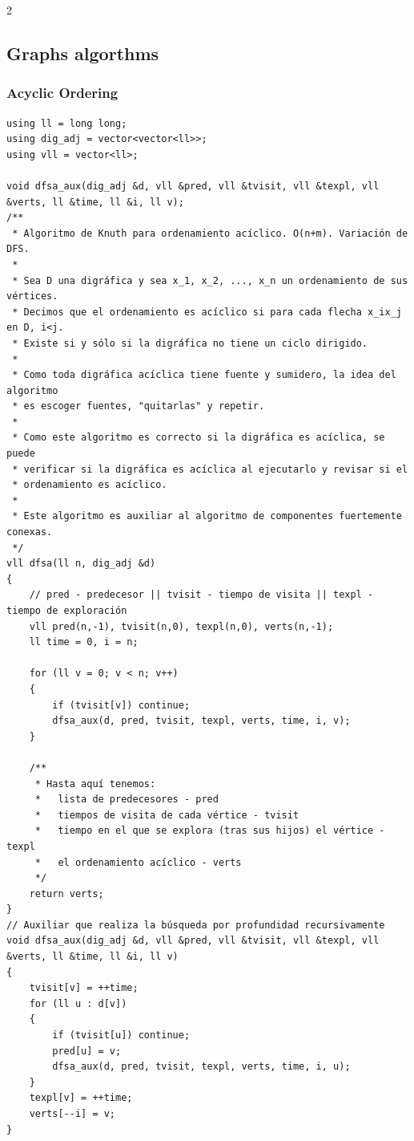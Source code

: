 \documentclass[twoside]{article}
\begin{document}
\begin{multicols*}{2}
	{
		\subsection*{Graphs algorthms}
	}
	{
		\subsubsection*{Acyclic Ordering}
	}
	\begin{verbatim}
using ll = long long;
using dig_adj = vector<vector<ll>>;
using vll = vector<ll>;

void dfsa_aux(dig_adj &d, vll &pred, vll &tvisit, vll &texpl, vll &verts, ll &time, ll &i, ll v);
/**
 * Algoritmo de Knuth para ordenamiento acíclico. O(n+m). Variación de DFS.
 *
 * Sea D una digráfica y sea x_1, x_2, ..., x_n un ordenamiento de sus vértices.
 * Decimos que el ordenamiento es acíclico si para cada flecha x_ix_j en D, i<j.
 * Existe si y sólo si la digráfica no tiene un ciclo dirigido.
 *
 * Como toda digráfica acíclica tiene fuente y sumidero, la idea del algoritmo
 * es escoger fuentes, "quitarlas" y repetir.
 *
 * Como este algoritmo es correcto si la digráfica es acíclica, se puede
 * verificar si la digráfica es acíclica al ejecutarlo y revisar si el
 * ordenamiento es acíclico.
 *
 * Este algoritmo es auxiliar al algoritmo de componentes fuertemente conexas.
 */
vll dfsa(ll n, dig_adj &d)
{
    // pred - predecesor || tvisit - tiempo de visita || texpl - tiempo de exploración
    vll pred(n,-1), tvisit(n,0), texpl(n,0), verts(n,-1);
    ll time = 0, i = n;

    for (ll v = 0; v < n; v++)
    {
        if (tvisit[v]) continue;
        dfsa_aux(d, pred, tvisit, texpl, verts, time, i, v);
    }

    /**
     * Hasta aquí tenemos:
     *   lista de predecesores - pred
     *   tiempos de visita de cada vértice - tvisit
     *   tiempo en el que se explora (tras sus hijos) el vértice - texpl
     *   el ordenamiento acíclico - verts
     */
    return verts;
}
// Auxiliar que realiza la búsqueda por profundidad recursivamente
void dfsa_aux(dig_adj &d, vll &pred, vll &tvisit, vll &texpl, vll &verts, ll &time, ll &i, ll v)
{
    tvisit[v] = ++time;
    for (ll u : d[v])
    {
        if (tvisit[u]) continue;
        pred[u] = v;
        dfsa_aux(d, pred, tvisit, texpl, verts, time, i, u);
    }
    texpl[v] = ++time;
    verts[--i] = v;       
}


\end{verbatim}
\end{multicols*}
\end{document}
